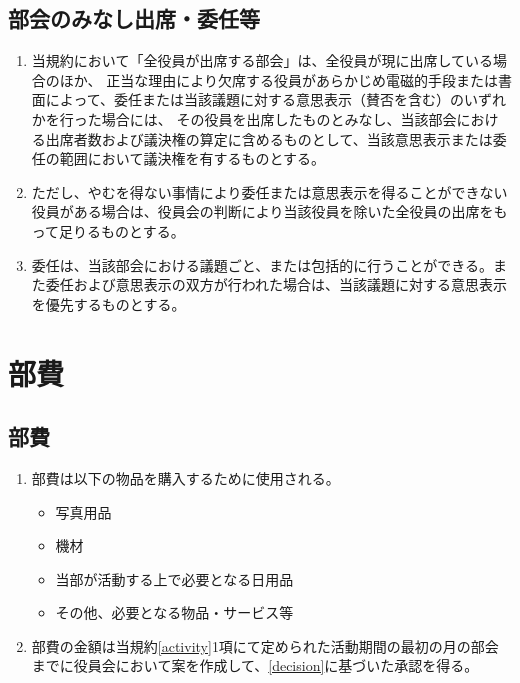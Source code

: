 \documentclass[12pt, unicode, a4paper]{ltjsreport}
\begin{document}
    \section{部会のみなし出席・委任等}\label{meeting-decision}
        \begin{enumerate}
            \item 当規約において「全役員が出席する部会」は、全役員が現に出席している場合のほか、
            正当な理由により欠席する役員があらかじめ電磁的手段または書面によって、委任または当該議題に対する意思表示（賛否を含む）のいずれかを行った場合には、
            その役員を出席したものとみなし、当該部会における出席者数および議決権の算定に含めるものとして、当該意思表示または委任の範囲において議決権を有するものとする。
            \item ただし、やむを得ない事情により委任または意思表示を得ることができない役員がある場合は、役員会の判断により当該役員を除いた全役員の出席をもって足りるものとする。
            \item 委任は、当該部会における議題ごと、または包括的に行うことができる。また委任および意思表示の双方が行われた場合は、当該議題に対する意思表示を優先するものとする。
        \end{enumerate}


\chapter{部費}
    \section{部費}\label{budget}
        \begin{enumerate}
            \item 部費は以下の物品を購入するために使用される。
            \begin{itemize}
                \item 写真用品
                \item 機材
                \item 当部が活動する上で必要となる日用品
                \item その他、必要となる物品・サービス等
            \end{itemize}
            \item 部費の金額は当規約\ref{activity}1項にて定められた活動期間の最初の月の部会までに役員会において案を作成して、\ref{decision}に基づいた承認を得る。
        \end{enumerate}
\end{document}
